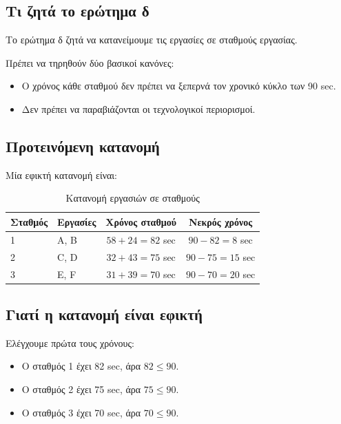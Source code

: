 \documentclass[12pt,a4paper]{article}
\begin{document}
\subsection{Τι ζητά το ερώτημα δ}

Το ερώτημα δ ζητά να κατανείμουμε τις εργασίες σε σταθμούς εργασίας.

Πρέπει να τηρηθούν δύο βασικοί κανόνες:

\begin{itemize}
    \item Ο χρόνος κάθε σταθμού δεν πρέπει να ξεπερνά τον χρονικό κύκλο των 90 sec.
    \item Δεν πρέπει να παραβιάζονται οι τεχνολογικοί περιορισμοί.
\end{itemize}

\subsection{Προτεινόμενη κατανομή}

Μία εφικτή κατανομή είναι:

\begin{table}[H]
\centering
\caption{Κατανομή εργασιών σε σταθμούς}
\begin{tabular}{llcc}
\toprule
\textbf{Σταθμός} & \textbf{Εργασίες} & \textbf{Χρόνος σταθμού} & \textbf{Νεκρός χρόνος} \\
\midrule
1 & A, B & \(58+24=82\) sec & \(90-82=8\) sec \\
2 & C, D & \(32+43=75\) sec & \(90-75=15\) sec \\
3 & E, F & \(31+39=70\) sec & \(90-70=20\) sec \\
\bottomrule
\end{tabular}
\end{table}

\subsection{Γιατί η κατανομή είναι εφικτή}

Ελέγχουμε πρώτα τους χρόνους:

\begin{itemize}
    \item Ο σταθμός 1 έχει 82 sec, άρα \(82 \leq 90\).
    \item Ο σταθμός 2 έχει 75 sec, άρα \(75 \leq 90\).
    \item Ο σταθμός 3 έχει 70 sec, άρα \(70 \leq 90\).
\end{itemize}
\end{document}
